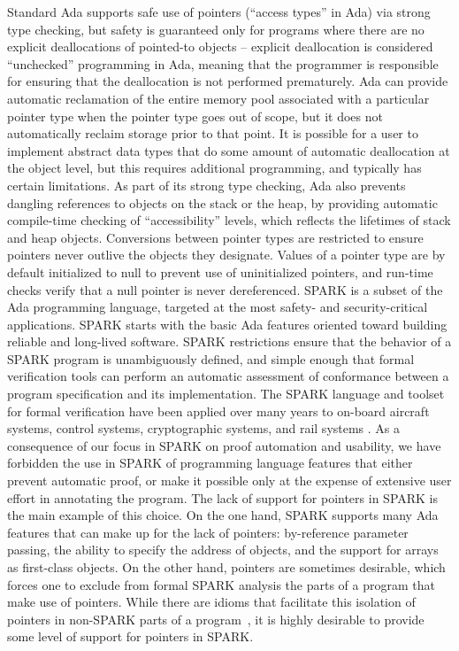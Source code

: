 \documentclass{llncs}
\begin{document}
Standard Ada supports safe use of pointers (``access types'' in Ada) via strong type checking, but safety is guaranteed only for programs where there are no explicit deallocations of pointed-to objects -- explicit deallocation is considered ``unchecked'' programming in Ada, meaning that the programmer is responsible for ensuring that the deallocation is not performed prematurely. Ada can provide automatic reclamation of the entire memory pool associated with a particular pointer type when the pointer type goes out of scope, but it does not automatically reclaim storage prior to that point. It is possible for a user to implement abstract data types that do some amount of automatic deallocation at the object level, but this requires additional programming, and typically has certain limitations. As part of its strong type checking, Ada also prevents dangling references to objects on the stack or the heap, by providing automatic compile-time checking of ``accessibility'' levels, which reflects the lifetimes of stack and heap objects.  Conversions between pointer types are restricted to ensure pointers never outlive the objects they designate. Values of a pointer type are by default initialized to null to prevent use of uninitialized pointers, and run-time checks verify that a null pointer is never dereferenced.
SPARK is a subset of the Ada programming language, targeted at the most safety- and security-critical applications. SPARK starts with the basic Ada features oriented toward building reliable and long-lived software. SPARK restrictions ensure that the behavior of a SPARK program is unambiguously defined, and simple enough that formal verification tools can perform an automatic assessment of conformance between a program specification and its implementation. The SPARK language and toolset for formal verification have been applied over many years to on-board aircraft systems,
control systems, cryptographic systems, and rail systems \cite{ONeill2012, McCormick2015}.
As a consequence of our focus in SPARK on proof automation and usability, we have forbidden the use in SPARK of programming language features that either prevent automatic proof, or make it possible only at the expense of extensive user effort in annotating the program. The lack of support for pointers in SPARK is the main example of this choice. On the one hand, SPARK supports many Ada features that can make up for the lack of pointers: by-reference parameter passing, the ability to specify the address of objects, and the support for arrays as first-class objects. On the other hand, pointers are sometimes desirable, which forces one to exclude from formal SPARK analysis the parts of a program that make use of pointers. While there are idioms that facilitate this isolation of pointers in non-SPARK parts of a program~\cite{AdaCoreThalesSPARK}, it is highly desirable to provide some level of support for pointers in SPARK.
\end{document}
